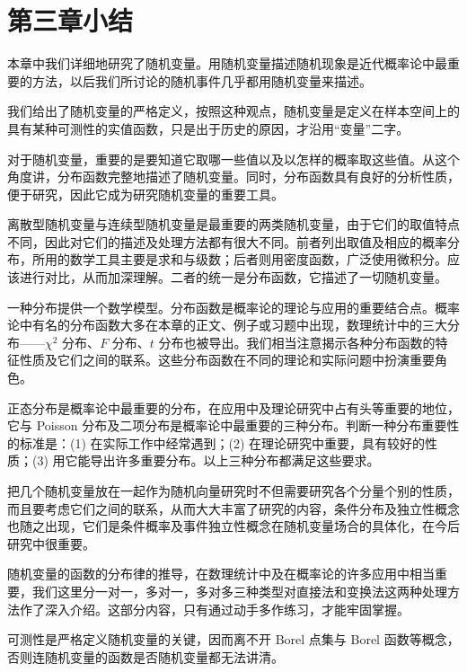 \documentclass[../../main.tex]{subfiles}
\begin{document}
\section*{第三章小结}\label{section:ch03-第三章小结}

本章中我们详细地研究了随机变量。用随机变量描述随机现象是近代概率论中最重要的方法，以后我们所讨论的随机事件几乎都用随机变量来描述。

我们给出了随机变量的严格定义，按照这种观点，随机变量是定义在样本空间上的具有某种可测性的实值函数，只是出于历史的原因，才沿用“变量”二字。

对于随机变量，重要的是要知道它取哪一些值以及以怎样的概率取这些值。从这个角度讲，分布函数完整地描述了随机变量。同时，分布函数具有良好的分析性质，便于研究，因此它成为研究随机变量的重要工具。

离散型随机变量与连续型随机变量是最重要的两类随机变量，由于它们的取值特点不同，因此对它们的描述及处理方法都有很大不同。前者列出取值及相应的概率分布，所用的数学工具主要是求和与级数；后者则用密度函数，广泛使用微积分。应该进行对比，从而加深理解。二者的统一是分布函数，它描述了一切随机变量。

一种分布提供一个数学模型。分布函数是概率论的理论与应用的重要结合点。概率论中有名的分布函数大多在本章的正文、例子或习题中出现，数理统计中的三大分布——$\chi^{2}$ 分布、$F$ 分布、$t$ 分布也被导出。我们相当注意揭示各种分布函数的特征性质及它们之间的联系。这些分布函数在不同的理论和实际问题中扮演重要角色。

正态分布是概率论中最重要的分布，在应用中及理论研究中占有头等重要的地位，它与 Poisson 分布及二项分布是概率论中最重要的三种分布。判断一种分布重要性的标准是：(1) 在实际工作中经常遇到；(2) 在理论研究中重要，具有较好的性质；(3) 用它能导出许多重要分布。以上三种分布都满足这些要求。

把几个随机变量放在一起作为随机向量研究时不但需要研究各个分量个别的性质，而且要考虑它们之间的联系，从而大大丰富了研究的内容，条件分布及独立性概念也随之出现，它们是条件概率及事件独立性概念在随机变量场合的具体化，在今后研究中很重要。

随机变量的函数的分布律的推导，在数理统计中及在概率论的许多应用中相当重要，我们这里分一对一，多对一，多对多三种类型对直接法和变换法这两种处理方法作了深入介绍。这部分内容，只有通过动手多作练习，才能牢固掌握。

可测性是严格定义随机变量的关键，因而离不开 Borel 点集与 Borel 函数等概念，否则连随机变量的函数是否随机变量都无法讲清。
\end{document}
